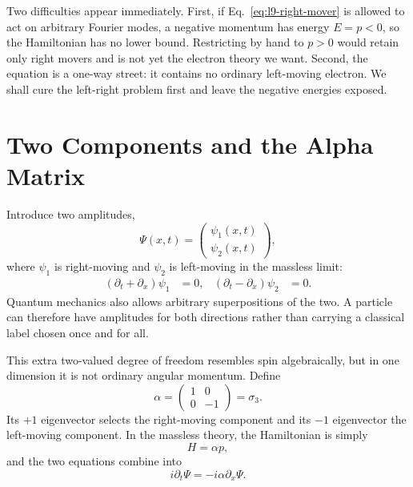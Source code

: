Two difficulties appear immediately. First, if Eq.~\eqref{eq:l9-right-mover} is allowed to act on arbitrary Fourier modes, a negative momentum has energy \(E=p<0\), so the Hamiltonian has no lower bound. Restricting by hand to \(p>0\) would retain only right movers and is not yet the electron theory we want. Second, the equation is a one-way street: it contains no ordinary left-moving electron. We shall cure the left-right problem first and leave the negative energies exposed.

\section{Two Components and the Alpha Matrix}

Introduce two amplitudes,
\begin{equation}
\Psi(x,t)=
\begin{pmatrix}
\psi_1(x,t)\\[3pt]
\psi_2(x,t)
\end{pmatrix},
\end{equation}
where \(\psi_1\) is right-moving and \(\psi_2\) is left-moving in the massless limit:
\begin{align}
(\partial_t+\partial_x)\psi_1&=0,
&
(\partial_t-\partial_x)\psi_2&=0.
\end{align}
Quantum mechanics also allows arbitrary superpositions of the two. A particle can therefore have amplitudes for both directions rather than carrying a classical label chosen once and for all.

This extra two-valued degree of freedom resembles spin algebraically, but in one dimension it is not ordinary angular momentum. Define
\begin{equation}
\alpha=
\begin{pmatrix}
1&0\\
0&-1
\end{pmatrix}
=\sigma_3.
\label{eq:l9-alpha}
\end{equation}
Its \(+1\) eigenvector selects the right-moving component and its \(-1\) eigenvector the left-moving component. In the massless theory, the Hamiltonian is simply
\begin{equation}
H=\alpha p,
\end{equation}
and the two equations combine into
\begin{equation}
i\partial_t\Psi=-i\alpha\partial_x\Psi.
\label{eq:l9-massless-dirac}
\end{equation}

\begin{classroomqa}
\end{classroomqa}

